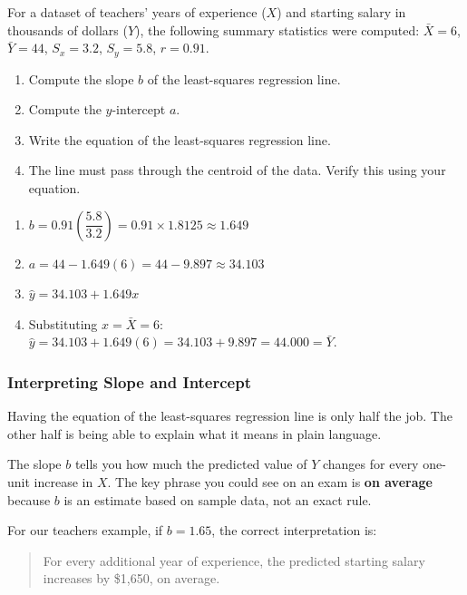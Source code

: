 \begin{Exercise}[title={Computing the Line}, label={ex:lr_computeline}]
For a dataset of teachers' years of experience ($X$) and starting salary in
thousands of dollars ($Y$), the following summary statistics were computed:
$\bar{X} = 6$, $\bar{Y} = 44$, $S_x = 3.2$, $S_y = 5.8$, $r = 0.91$.
\begin{enumerate}
    \item Compute the slope $b$ of the least-squares regression line.
    \item Compute the $y$-intercept $a$.
    \item Write the equation of the least-squares regression line.
    \item The line must pass through the centroid of the data. Verify this using
    your equation.
\end{enumerate}
\end{Exercise}
\begin{Answer}[ref={ex:lr_computeline}]
\begin{enumerate}
    \item $b = 0.91 \left(\dfrac{5.8}{3.2}\right) = 0.91 \times 1.8125 \approx 1.649$
    \item $a = 44 - 1.649(6) = 44 - 9.897 \approx 34.103$
    \item $\hat{y} = 34.103 + 1.649x$
    \item Substituting $x = \bar{X} = 6$: $\hat{y} = 34.103 + 1.649(6) = 34.103
    + 9.897 = 44.000 = \bar{Y}$. \checkmark
\end{enumerate}
\end{Answer}



\subsubsection{Interpreting Slope and Intercept}

Having the equation of the least-squares regression line is only half the job.
The other half is being able to explain what it means in plain language. 

The slope $b$ tells you how much the predicted value of $Y$ changes for every
one-unit increase in $X$. The key phrase you could see on an exam is \textbf{on
average} because $b$ is an estimate based on sample data, not an exact rule.

For our teachers example, if $b = 1.65$, the correct interpretation is:

\begin{quote}
For every additional year of experience, the predicted starting salary increases
by \$1{,}650, on average.
\end{quote}

